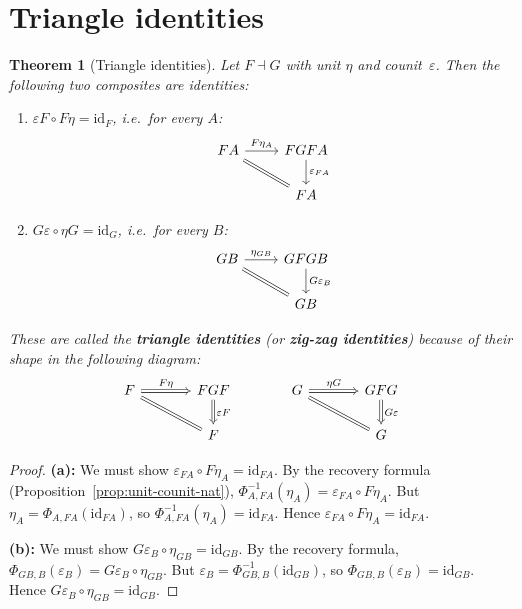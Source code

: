 \documentclass[a4paper,12pt]{book}
\newcommand{\id}{\mathrm{id}}
\theoremstyle{definition}
\theoremstyle{plain}
\newtheorem{theorem}[definition]{Theorem}
\theoremstyle{remark}
\begin{document}
\section{Triangle identities}\label{sec:triangle-identities}

\begin{theorem}[Triangle identities]\label{thm:triangle-identities}
Let $F\dashv G$ with unit $\eta$ and counit~$\varepsilon$.
Then the following two composites are identities:
\begin{enumerate}[label=(\alph*)]
\item $\varepsilon F \circ F\eta = \id_F$, i.e.\ for every $A$:
\[
\begin{tikzcd}
FA \arrow[r, "F\eta_A"] \arrow[dr, equal] & FGFA \arrow[d, "\varepsilon_{FA}"] \\
& FA
\end{tikzcd}
\]
\item $G\varepsilon \circ \eta G = \id_G$, i.e.\ for every $B$:
\[
\begin{tikzcd}
GB \arrow[r, "\eta_{GB}"] \arrow[dr, equal] & GFGB \arrow[d, "G\varepsilon_B"] \\
& GB
\end{tikzcd}
\]
\end{enumerate}
These are called the \textbf{triangle identities} (or \textbf{zig-zag
identities}) because of their shape in the following diagram:
\[
\begin{tikzcd}[column sep=large]
F \arrow[r, Rightarrow, "F\eta"] \arrow[dr, equal]
  & FGF \arrow[d, Rightarrow, "\varepsilon F"] &
G \arrow[r, Rightarrow, "\eta G"] \arrow[dr, equal]
  & GFG \arrow[d, Rightarrow, "G\varepsilon"] \\
& F & & G
\end{tikzcd}
\]
\end{theorem}

\begin{proof}
\textbf{(a):}
We must show $\varepsilon_{FA}\circ F\eta_A = \id_{FA}$.
By the recovery formula (Proposition~\ref{prop:unit-counit-nat}),
$\Phi^{-1}_{A,FA}(\eta_A) = \varepsilon_{FA}\circ F\eta_A$.
But $\eta_A = \Phi_{A,FA}(\id_{FA})$, so
$\Phi^{-1}_{A,FA}(\eta_A) = \id_{FA}$.
Hence $\varepsilon_{FA}\circ F\eta_A = \id_{FA}$.

\medskip
\textbf{(b):}
We must show $G\varepsilon_B\circ\eta_{GB} = \id_{GB}$.
By the recovery formula,
$\Phi_{GB,B}(\varepsilon_B) = G\varepsilon_B\circ\eta_{GB}$.
But $\varepsilon_B = \Phi^{-1}_{GB,B}(\id_{GB})$, so
$\Phi_{GB,B}(\varepsilon_B) = \id_{GB}$.
Hence $G\varepsilon_B\circ\eta_{GB} = \id_{GB}$.
\end{proof}
\end{document}
